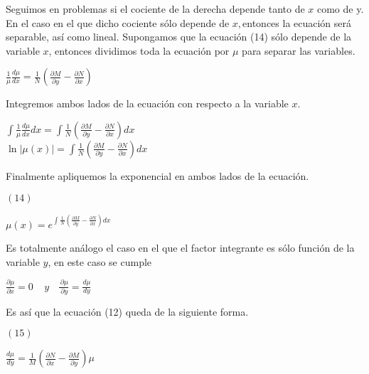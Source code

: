 \documentclass[l etterpaper,11pt]{article}
\begin{document}
Seguimos en problemas si el cociente de la derecha depende tanto de $ x$ como de y. En el caso en el que dicho cociente sólo depende de $ x, $entonces la ecuación será separable, así como lineal.
Supongamos que la ecuación (14) sólo depende de la variable $ x $, entonces dividimos toda la ecuación por $ \mu $ para separar las variables.
\begin{center}

$\frac{1}{\mu}\frac{d\mu}{dx}=\frac{1}{N}(\frac{\partial M}{\partial y}-\frac{\partial N}{\partial x})$\\
\end{center}

Integremos ambos lados de la ecuación con respecto a la variable $ x $.

\begin{center}

$\int{\frac{1}{\mu}\frac{d\mu}{dx}dx}=\int{\frac{1}{N}\left(\frac{\partial M}{\partial y}-\frac{\partial N}{\partial x}\right)dx}$\\
$\ln{\left|\mu\left(x\right)\right|}=\int{\frac{1}{N}\left(\frac{\partial M}{\partial y}-\frac{\partial N}{\partial x}\right)dx}$\\
\end{center}

Finalmente apliquemos la exponencial en ambos lados de la ecuación.
\begin{flushleft} 
$(14)$
\end{flushleft}

\begin{center}

$\mu(x)=e^{\int\frac{1}{N}(\frac{\partial M}{\partial y}-\frac{\partial N}{\partial x})dx}$\\
\end{center}

Es totalmente análogo el caso en el que el factor integrante es sólo función de la variable $ y $, en este caso se cumple
\begin{center}

$\frac{\partial\mu}{\partial x}=0\ \ \ \ \ y\ \ \ \ \frac{\ \partial\mu}{\ \partial y}=\frac{d\mu}{dy}$\\
\end{center}

Es así que la ecuación (12) queda de la siguiente forma.
\begin{flushleft} 
$(15)$
\end{flushleft}
\begin{center}

$\frac{d\mu}{dy}=\frac{1}{M}(\frac{\partial N}{\partial x}-\frac{\partial M}{\partial y})\mu$\\
\end{center}
\end{document}
